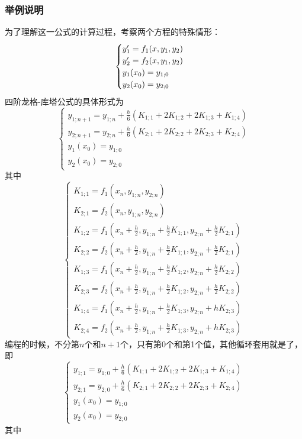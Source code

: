 \subsubsection{举例说明}
为了理解这一公式的计算过程，考察两个方程的特殊情形：
$$\begin{cases}
y_1\rq{}=f_1(x,y_1,y_2)\\
y_2\rq{}=f_2(x,y_1,y_2)\\
y_1(x_0)=y_{1;0}\\
y_2(x_0)=y_{2;0}
\end{cases}$$
四阶龙格-库塔公式的具体形式为
$$\begin{cases}
y_{1;n+1}=y_{1;n}+\frac{h}{6}(K_{1;1}+2K_{1;2}+2K_{1;3}+K_{1;4})\\
y_{2;n+1}=y_{2;n}+\frac{h}{6}(K_{2;1}+2K_{2;2}+2K_{2;3}+K_{2;4})\\
y_1(x_0)=y_{1;0}\\
y_2(x_0)=y_{2;0}
\end{cases}$$
其中
$$\begin{cases}
K_{1;1}=f_1(x_n,y_{1;n},y_{2;n})\\
K_{2;1}=f_2(x_n,y_{1;n},y_{2;n})\\
K_{1;2}=f_1(x_n+\frac{h}{2},y_{1;n}+\frac{h}{2}K_{1;1},y_{2;n}+\frac{h}{2}K_{2;1})\\
K_{2;2}=f_2(x_n+\frac{h}{2},y_{1;n}+\frac{h}{2}K_{1;1},y_{2;n}+\frac{h}{2}K_{2;1})\\
K_{1;3}=f_1(x_n+\frac{h}{2},y_{1;n}+\frac{h}{2}K_{1;2},y_{2;n}+\frac{h}{2}K_{2;2})\\
K_{2;3}=f_2(x_n+\frac{h}{2},y_{1;n}+\frac{h}{2}K_{1;2},y_{2;n}+\frac{h}{2}K_{2;2})\\
K_{1;4}=f_1(x_n+\frac{h}{2},y_{1;n}+\frac{h}{2}K_{1;3},y_{2;n}+hK_{2;3})\\
K_{2;4}=f_2(x_n+\frac{h}{2},y_{1;n}+\frac{h}{2}K_{1;3},y_{2;n}+hK_{2;3})
\end{cases}$$
编程的时候，不分第$n$个和$n+1$个，只有第0个和第1个值，其他循环套用就是了，即
$$\begin{cases}
y_{1;1}=y_{1;0}+\frac{h}{6}(K_{1;1}+2K_{1;2}+2K_{1;3}+K_{1;4})\\
y_{2;1}=y_{2;0}+\frac{h}{6}(K_{2;1}+2K_{2;2}+2K_{2;3}+K_{2;4})\\
y_1(x_0)=y_{1;0}\\
y_2(x_0)=y_{2;0}
\end{cases}$$
其中
